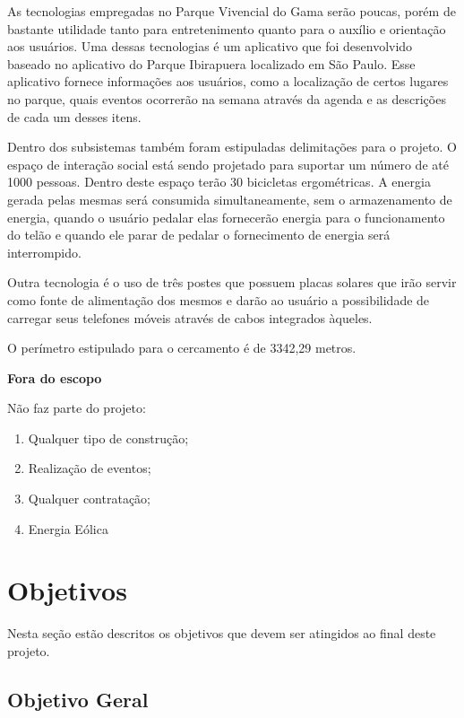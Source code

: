 	As tecnologias empregadas no Parque Vivencial do Gama serão poucas, porém de bastante utilidade tanto para entretenimento quanto para o auxílio e orientação aos usuários. Uma dessas tecnologias é um aplicativo que foi desenvolvido baseado no aplicativo do Parque Ibirapuera localizado em São Paulo. Esse aplicativo fornece informações aos usuários, como a localização de certos lugares no parque, quais eventos ocorrerão na semana através da agenda e as descrições de cada um desses itens.
	
	Dentro dos subsistemas também foram estipuladas delimitações para o projeto. O espaço de interação social está sendo projetado para suportar um número de até 1000 pessoas. Dentro deste espaço terão 30 bicicletas ergométricas. A energia gerada pelas mesmas será consumida simultaneamente, sem o armazenamento de energia, quando o usuário pedalar elas fornecerão energia para o funcionamento do telão e quando ele parar de pedalar o fornecimento de energia será interrompido.
	
	Outra tecnologia é o uso de três postes que possuem placas solares que irão servir como fonte de alimentação dos mesmos e darão ao usuário a possibilidade de carregar seus telefones móveis através de cabos integrados àqueles.
	
	O perímetro estipulado para o cercamento é de 3342,29 metros.
	
\textbf{Fora do escopo}

Não faz parte do projeto:

\begin{enumerate}
        \item Qualquer tipo de construção;
        \item Realização de eventos;
        \item Qualquer contratação;
        \item Energia Eólica
        \end{enumerate}

\section{Objetivos}

Nesta se\c{c}\~ao est\~ao descritos os objetivos que devem ser atingidos ao final deste projeto.

\subsection{Objetivo Geral}

